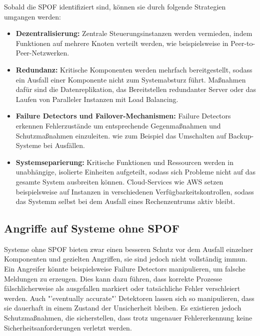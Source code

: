 \documentclass[a4paper,12pt]{article}
\begin{document}
Sobald die SPOF identifiziert sind, können sie durch folgende Strategien umgangen werden:

\begin{itemize}
    \item \textbf{Dezentralisierung:} Zentrale Steuerungsinstanzen werden vermieden, indem Funktionen auf mehrere Knoten verteilt werden, wie beispielsweise in Peer-to-Peer-Netzwerken.
    \item \textbf{Redundanz:} Kritische Komponenten werden mehrfach bereitgestellt, sodass ein Ausfall einer Komponente nicht zum Systemabsturz führt. Maßnahmen dafür sind die Datenreplikation, das Bereitstellen redundanter Server oder das Laufen von Paralleler Instanzen mit Load Balancing.
    \item \textbf{Failure Detectors und Failover-Mechanismen:} Failure Detectors erkennen Fehlerzustände um entsprechende Gegenmaßnahmen und Schutzmaßnahmen einzuleiten. wie zum Beispiel das Umschalten auf Backup-Systeme bei Ausfällen.
    \item \textbf{Systemseparierung:} Kritische Funktionen und Ressourcen werden in unabhängige, isolierte Einheiten aufgeteilt, sodass sich Probleme nicht auf das gesamte System ausbreiten können. Cloud-Services wie AWS setzen beispielsweise auf Instanzen in verschiedenen Verfügbarkeitskontrollen, sodass das Systemm selbst bei dem Ausfall eines Rechenzentrums aktiv bleibt.
\end{itemize}

\subsection{Angriffe auf Systeme ohne SPOF}
Systeme ohne SPOF bieten zwar einen besseren Schutz vor dem Ausfall einzelner Komponenten und gezielten Angriffen, sie sind jedoch nicht vollständig immun. Ein Angreifer könnte beispielsweise Failure Detectors manipulieren, um falsche Meldungen zu erzeugen. Dies kann dazu führen, dass korrekte Prozesse fälschlicherweise als ausgefallen markiert oder tatsächliche Fehler verschleiert werden. Auch "'eventually accurate"' Detektoren lassen sich so manipulieren, dass sie dauerhaft in einem Zustand der Unsicherheit bleiben. Es existieren jedoch Schutzmaßnahmen, die sicherstellen, dass trotz ungenauer Fehlererkennung keine Sicherheitsanforderungen verletzt werden. \cite{10.1145/1052796.1052806}
\end{document}
